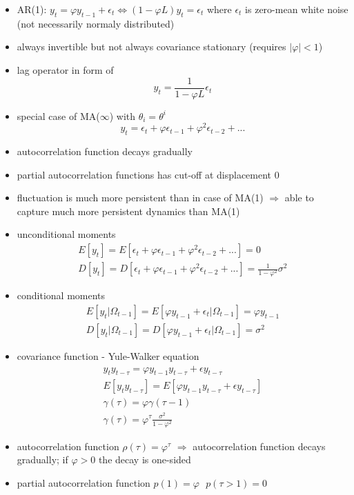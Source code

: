 \begin{itemize}
\item AR(1): $y_t = \varphi y_{t - 1} + \epsilon_{t} \Leftrightarrow (1 - \varphi L)y_t = \epsilon_t$ where $\epsilon_t$ is zero-mean white noise (not necessarily normaly distributed)
\item always invertible but not always covariance stationary (requires $|\varphi| < 1$)
\item lag operator in form of
\begin{equation*}
y_t = \frac{1}{1 - \varphi L} \epsilon_t
\end{equation*}
\item special case of MA($\infty$) with $\theta_i = \theta^i$
\begin{equation*}
y_t = \epsilon_t + \varphi \epsilon_{t-1} + \varphi^2 \epsilon_{t-2} + ...
\end{equation*}
\item autocorrelation function decays gradually
\item partial autocorrelation functions has cut-off at displacement 0 
\item fluctuation is much more persistent than in case of MA(1) $\Rightarrow$ able to capture much more persistent dynamics than MA(1)
\item unconditional moments
\begin{gather*}
E[y_t] = E[\epsilon_t + \varphi \epsilon_{t-1} + \varphi^2 \epsilon_{t-2} + ...] = 0\\
D[y_t] = D[\epsilon_t + \varphi \epsilon_{t-1} + \varphi^2 \epsilon_{t-2} + ...] = \frac{1}{1 - \varphi^2}\sigma^2
\end{gather*}
\item conditional moments
\begin{gather*}
E[y_t | \Omega_{t - 1}] = E[\varphi y_{t - 1} + \epsilon_{t} | \Omega_{t - 1}] = \varphi y_{t - 1}\\
D[y_t | \Omega_{t - 1}] = D[\varphi y_{t - 1} + \epsilon_{t} | \Omega_{t - 1}] = \sigma^2
\end{gather*}
\item covariance function - Yule-Walker equation
\begin{gather*}
y_t y_{t - \tau} = \varphi y_{t - 1} y_{t - \tau} + \epsilon y_{t - \tau}\\
E[y_t y_{t - \tau}] = E[\varphi y_{t - 1} y_{t - \tau} + \epsilon y_{t - \tau}]\\
\gamma(\tau) = \varphi \gamma (\tau - 1)\\
\gamma(\tau) = \varphi^{\tau} \frac{\sigma^2}{1 - \varphi^2}
\end{gather*}
\item autocorrelation function $\rho(\tau) = \varphi^{\tau}$ $\Rightarrow$ autocorrelation function decays gradually; if $\varphi > 0$ the decay is one-sided
\item partial autocorrelation function $p(1) = \varphi ~~~ p(\tau > 1) = 0$
\end{itemize}

